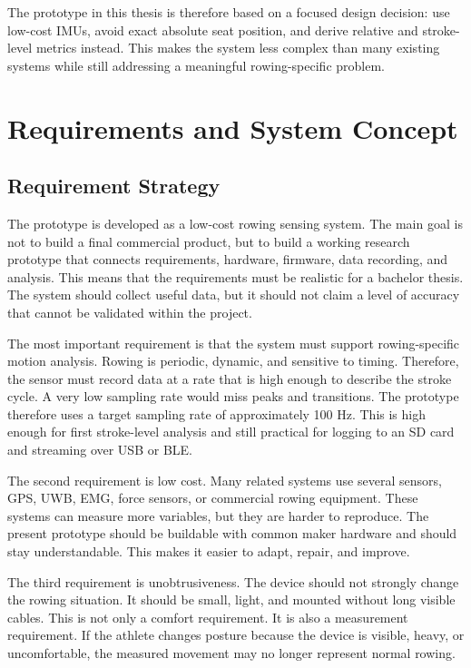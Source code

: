 The prototype in this thesis is therefore based on a focused design decision: use low-cost IMUs, avoid exact absolute seat position, and derive relative and stroke-level metrics instead. This makes the system less complex than many existing systems while still addressing a meaningful rowing-specific problem.


\chapter{Requirements and System Concept} %

\section{Requirement Strategy}

The prototype is developed as a low-cost rowing sensing system. The main goal is not to build a final commercial product, but to build a working research prototype that connects requirements, hardware, firmware, data recording, and analysis. This means that the requirements must be realistic for a bachelor thesis. The system should collect useful data, but it should not claim a level of accuracy that cannot be validated within the project.

The most important requirement is that the system must support rowing-specific motion analysis. Rowing is periodic, dynamic, and sensitive to timing. Therefore, the sensor must record data at a rate that is high enough to describe the stroke cycle. A very low sampling rate would miss peaks and transitions. The prototype therefore uses a target sampling rate of approximately 100 Hz. This is high enough for first stroke-level analysis and still practical for logging to an SD card and streaming over USB or BLE.

The second requirement is low cost. Many related systems use several sensors, GPS, UWB, EMG, force sensors, or commercial rowing equipment. These systems can measure more variables, but they are harder to reproduce. The present prototype should be buildable with common maker hardware and should stay understandable. This makes it easier to adapt, repair, and improve.

The third requirement is unobtrusiveness. The device should not strongly change the rowing situation. It should be small, light, and mounted without long visible cables. This is not only a comfort requirement. It is also a measurement requirement. If the athlete changes posture because the device is visible, heavy, or uncomfortable, the measured movement may no longer represent normal rowing.

